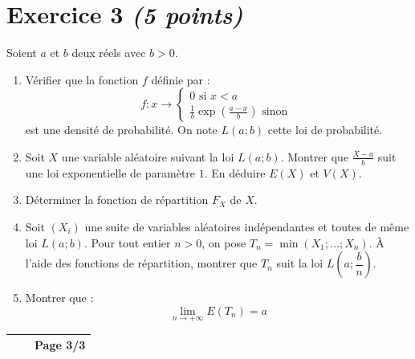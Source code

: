 \section*{Exercice 3 \hfill \normalfont\itshape (5 points)}
Soient $a$ et $b$ deux réels avec $b>0$.
\begin{enumerate}
    \item Vérifier que la fonction $f$ définie par :
    $$f:x \rightarrow \begin{cases}
        0 \text{ si } x<a\\
        \frac{1}{b} \exp \left (\frac{a-x}{b}\right ) \text{ sinon }
    \end{cases}$$
    est une densité de probabilité. On note $L(a;b)$ cette loi de probabilité.
    \item Soit $X$ une variable aléatoire suivant la loi $L(a;b)$. Montrer que $\frac{X-a}{b}$ suit une loi exponentielle de paramètre $1$. En déduire $E(X)$ et $V(X)$.
    \item Déterminer la fonction de répartition $F_X$ de $X$.
    \item Soit $(X_i)$ une suite de variables aléatoires indépendantes et toutes de même loi $L(a;b)$. Pour tout entier $n>0$, on pose $T_n= \min (X_1;\dots;X_n)$. À l'aide des fonctions de répartition, montrer que $T_n$ suit la loi $L\!\left(a;\dfrac{b}{n}\right)$.
    \item Montrer que :
    $$\lim_{n\rightarrow + \infty} E(T_n)=a$$
\end{enumerate}

\newpage

\begin{center}
    \renewcommand{\arraystretch}{1.5}
    \begin{tabular}{|>{\centering\arraybackslash}m{4cm}|>{\centering\arraybackslash}m{6cm}|>{\centering\arraybackslash}m{4cm}|}
        \hline
            \hspace{4cm}&\hspace{6cm} & \textbf{Page 3/3}\\
            \hline
    \end{tabular}
\end{center}

